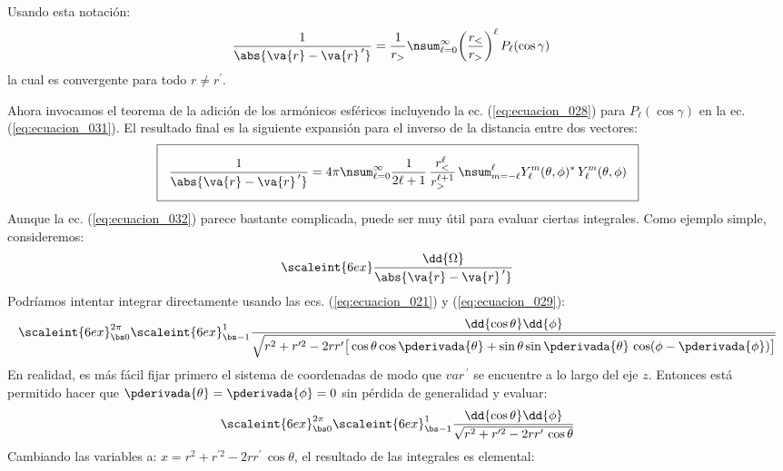 Usando esta notación:
\begin{align}
\dfrac{1}{\abs{\va{r} - \va{r}^{\, \prime}}} &= \dfrac{1}{r_{>}} \nsum_{\ell=0}^{\infty} \bigg( \dfrac{r_{<}}{r_{>}} \bigg)^{\ell} \, P_{\ell} (\cos \gamma)
\label{eq:ecuacion_031}
\end{align}
la cual es convergente para todo $r \neq r^{\prime}$.
\par
Ahora invocamos el teorema de la adición de los armónicos esféricos incluyendo la ec. (\ref{eq:ecuacion_028}) para $P_{\ell} (\cos \gamma)$ en la ec. (\ref{eq:ecuacion_031}). El resultado final es la siguiente expansión para el inverso de la distancia entre dos vectores:
\begin{align}
\setlength{\fboxsep}{3\fboxsep}\boxed{
\dfrac{1}{\abs{\va{r} - \va{r}^{\, \prime}}} = 4 \pi \nsum_{\ell=0}^{\infty} \dfrac{1}{2 \ell + 1} \, \dfrac{r_{<}^{\ell}}{r_{>}^{\ell+1}} \, \nsum_{m=-\ell}^{\ell} Y_{\ell}^{m} (\theta, \phi)^{*} \, Y_{\ell}^{m} (\theta, \phi)}
\label{eq:ecuacion_032}
\end{align}
Aunque la ec. (\ref{eq:ecuacion_032}) parece bastante complicada, puede ser muy útil para evaluar ciertas integrales. Como ejemplo simple, consideremos:
\begin{align}
\scaleint{6ex} \dfrac{\dd{\Omega}}{\abs{\va{r} - \va{r}^{\, \prime}}}
\label{eq:ecuacion_033}
\end{align}
Podríamos intentar integrar directamente usando las ecs. (\ref{eq:ecuacion_021}) y (\ref{eq:ecuacion_029}):
\begin{align*}
\scaleint{6ex}_{\bs 0}^{2 \pi} \scaleint{6ex}_{\bs -1}^{1} \dfrac{\dd{\cos \theta} \dd{\phi}}{\sqrt{r^{2} + r^{\prime 2} - 2 r r^{\prime} \big[ \cos \theta \cos \pderivada{\theta} + \sin \theta \sin \pderivada{\theta} \, \cos (\phi - \pderivada{\phi}) \big]}}
\end{align*}
En realidad, es más fácil fijar primero el sistema de coordenadas de modo que $va{r}^{\, \prime}$ se encuentre a lo largo del eje $z$. Entonces está permitido hacer que $\pderivada{\theta} = \pderivada{\phi} = 0$ sin pérdida de generalidad y evaluar:
\begin{align*}
\scaleint{6ex}_{\bs 0}^{2 \pi} \scaleint{6ex}_{\bs -1}^{1} \dfrac{\dd{\cos \theta} \dd{\phi}}{\sqrt{r^{2} + r^{\prime 2} - 2 r r^{\prime} \, \cos \theta}}
\end{align*}
Cambiando las variables a: $x = r^{2} + r^{\prime 2} - 2 r r^{\prime} \, \cos \theta$, el resultado de las integrales es elemental:
